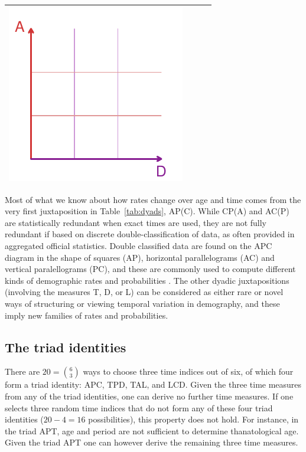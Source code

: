 \documentclass[12pt,oneside,a4paper]{article} %
\begin{document}
\begin{longtable}{m{}m{}m{}m{}}
  \includegraphics[scale=.5]{Figures/DiagramTable/AD_rt.pdf}  \\
  \bottomrule
\end{longtable}

Most of what we know about how rates change over age and time comes
from the very first juxtaposition in Table~\ref{tab:dyads}, AP(C). While
CP(A) and AC(P) are statistically redundant when exact times are used, they
are not fully redundant if based on discrete double-classification of data, as
often provided in aggregated official statistics. Double classified data are
found on the APC diagram in the shape of squares (AP), horizontal parallelograms
(AC) and vertical paralellograms (PC), and
these are commonly used to compute different kinds of demographic
rates and probabilities \citep[][p63]{caselli2005demography}. The other dyadic
juxtapositions (involving the measures T, D, or L) can be considered as either
rare or novel ways of structuring or viewing temporal variation in demography,
and these imply new families of rates and probabilities.

\subsection{The triad identities}
There are $20=\binom{6}{3}$ ways to choose three time indices out of
six, of which four form a triad identity: APC, TPD, TAL, and LCD.
Given the three time measures from any of the
triad identities, one can derive no further time measures. If one selects three
random time indices that do not form any of these four triad identities
($20-4=16$ possibilities), this property does not hold. For instance, in the
triad APT, age and period are not sufficient to determine thanatological age.
Given the triad APT one can however derive the remaining three time
measures.%
\end{document}
